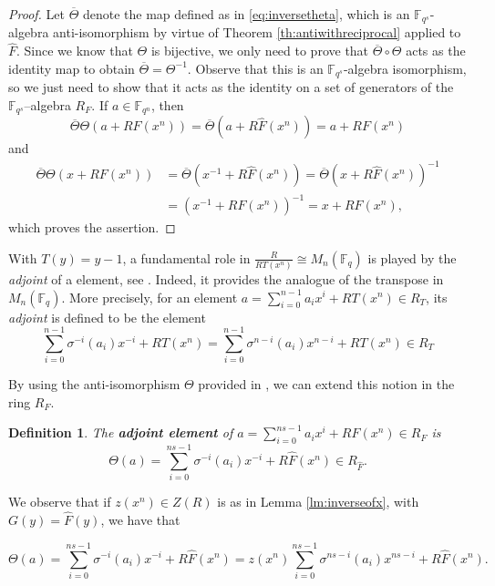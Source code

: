 \documentclass[a4paper, 11pt]{article}
\newtheorem{definition}[theorem]{Definition}
\newcommand{\F}{{\mathbb F}}
\begin{document}
\begin{proof}
    Let $\overline{\Theta}$ denote the map defined as in \eqref{eq:inversetheta}, which is an \(\F_{q^s}\)-algebra anti-isomorphism by virtue of Theorem  \ref{th:antiwithreciprocal} applied to \(\hat{F}\). Since we know that \(\Theta\) is bijective, we only need to prove that $\overline{\Theta} \circ \Theta$ acts as the identity map to obtain $\overline{\Theta} = \Theta^{-1}$. Observe that this is an \(\F_{q^s}\)-algebra isomorphism, so we just need to show that it acts as the identity on a set of generators of the \(\F_{q^s}\)--algebra \(R_F\). If \(a \in \F_{q^n}\), then
    \[
\overline{\Theta}\Theta (a + RF(x^n)) = \overline{\Theta}(a + R\hat{F}(x^n)) =a + RF(x^n)
\]
and
\[
\begin{split}
\overline{\Theta}\Theta (x + RF(x^n)) &= \overline{\Theta}(x^{-1} + R\hat{F}(x^n)) = \overline{\Theta}(x + R\hat{F}(x^n))^{-1} \\
&= (x^{-1} + RF(x^n))^{-1} = x + RF(x^n), 
\end{split}
\]
which proves the assertion.
\end{proof}

With $T(y)=y-1$, a fundamental role in $\frac{R}{RT(x^n)} \cong M_n(\F_{q})$ is played by the \emph{adjoint} of a element, see \cite[pag. 480]{sheekey2016new}. Indeed, it provides the analogue of the transpose in $M_n(\F_q)$. More precisely, for an element $a=\sum_{i=0}^{n-1}a_ix^i+RT(x^n) \in R_T$, its \emph{adjoint} is defined to be the element \[\sum_{i=0}^{n-1}\sigma^{-i}(a_i)x^{-i}+RT(x^n)=\sum_{i=0}^{n-1}\sigma^{n-i}(a_i)x^{n-i}+RT(x^n) \in R_T\]




By using the anti-isomorphism $\Theta$ provided in , we can extend this notion in the ring $R_F$.

\begin{definition} \label{def:adjoint}
  The \textbf{adjoint element} of  $a = \sum_{i=0}^{ns-1}a_ix^i + RF(x^n) \in R_F$ is 
    \[
    \Theta(a)=\sum_{i=0}^{ns-1} \sigma^{-i}(a_i)x^{-i} + R\hat{F}(x^{n}) \in R_{\hat{F}}.
    \]
\end{definition}

We observe that if $z(x^n) \in Z(R)$ is as in Lemma \ref{lm:inverseofx}, with $G(y)=\hat{F}(y)$, we have that 

\begin{equation} \label{eq:descryptionadjoint}
\Theta(a)=\sum_{i=0}^{ns-1} \sigma^{-i}(a_i)x^{-i} + R\hat{F}(x^n)=z(x^n)\sum_{i=0}^{ns-1} \sigma^{ns-i}(a_i)x^{ns-i} + R\hat{F}(x^n).
\end{equation}
\end{document}
